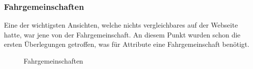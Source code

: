 \subsubsection{Fahrgemeinschaften}\label{mockups_carpools}
Eine der wichtigsten Ansichten, welche nichts vergleichbares auf der Webseite hatte, war jene von der Fahrgemeinschaft. An diesem Punkt wurden schon die ersten Überlegungen getroffen, was für Attribute eine Fahrgemeinschaft benötigt.
\begin{figure}[ht]
\centering
{}
\label{fig:mockup_carpool}
\caption{Fahrgemeinschaften}
\end{figure}

